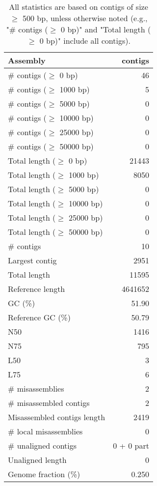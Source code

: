 \documentclass[12pt,a4paper]{article}
\begin{document}
\begin{table}[ht]
\begin{center}
\caption{All statistics are based on contigs of size $\geq$ 500 bp, unless otherwise noted (e.g., "\# contigs ($\geq$ 0 bp)" and "Total length ($\geq$ 0 bp)" include all contigs).}
\begin{tabular}{|l*{1}{|r}|}
\hline
Assembly & contigs \\ \hline
\# contigs ($\geq$ 0 bp) & 46 \\ \hline
\# contigs ($\geq$ 1000 bp) & 5 \\ \hline
\# contigs ($\geq$ 5000 bp) & 0 \\ \hline
\# contigs ($\geq$ 10000 bp) & 0 \\ \hline
\# contigs ($\geq$ 25000 bp) & 0 \\ \hline
\# contigs ($\geq$ 50000 bp) & 0 \\ \hline
Total length ($\geq$ 0 bp) & 21443 \\ \hline
Total length ($\geq$ 1000 bp) & 8050 \\ \hline
Total length ($\geq$ 5000 bp) & 0 \\ \hline
Total length ($\geq$ 10000 bp) & 0 \\ \hline
Total length ($\geq$ 25000 bp) & 0 \\ \hline
Total length ($\geq$ 50000 bp) & 0 \\ \hline
\# contigs & 10 \\ \hline
Largest contig & 2951 \\ \hline
Total length & 11595 \\ \hline
Reference length & 4641652 \\ \hline
GC (\%) & 51.90 \\ \hline
Reference GC (\%) & 50.79 \\ \hline
N50 & 1416 \\ \hline
N75 & 795 \\ \hline
L50 & 3 \\ \hline
L75 & 6 \\ \hline
\# misassemblies & 2 \\ \hline
\# misassembled contigs & 2 \\ \hline
Misassembled contigs length & 2419 \\ \hline
\# local misassemblies & 0 \\ \hline
\# unaligned contigs & 0 + 0 part \\ \hline
Unaligned length & 0 \\ \hline
Genome fraction (\%) & 0.250 \\ \hline

\end{tabular}
\end{center}
\end{table}
\end{document}

